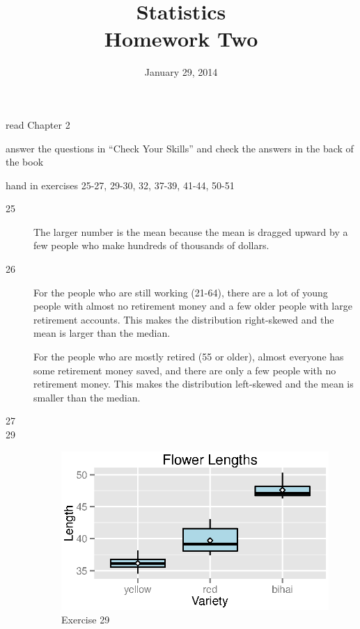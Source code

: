 \documentclass{exam}
\author{}
\date{January 29, 2014}
\title{Statistics \\ Homework Two}
\begin{document}
  \maketitle

  \ifprintanswers
  \else
    \begin{itemize*}
      \item read Chapter 2 
      \item answer the questions in ``Check Your Skills'' and check the answers in the back of the book
      \item hand in exercises 25-27, 29-30, 32, 37-39, 41-44, 50-51
    \end{itemize*}
  \fi

  \ifprintanswers
    \begin{description}
      \item[25] The larger number is the mean because the mean is dragged upward by a few people who make hundreds of
        thousands of dollars.

      \item[26] For the people who are still working (21-64), there are a lot of young people with almost no retirement
        money and a few older people with large retirement accounts.  This makes the distribution right-skewed and the
        mean is larger than the median.

        For the people who are mostly retired (55 or older), almost everyone has some retirement money saved, and there
        are only a few people with no retirement money.  This makes the distribution left-skewed and the mean is smaller
        than the median.

      \item[27] 

      \item[29]
        \begin{figure}[H]
          \centering
          \includegraphics{figures/ex29.eps}
          \caption{Exercise 29}
        \end{figure}


\end{description}
\end{document}
